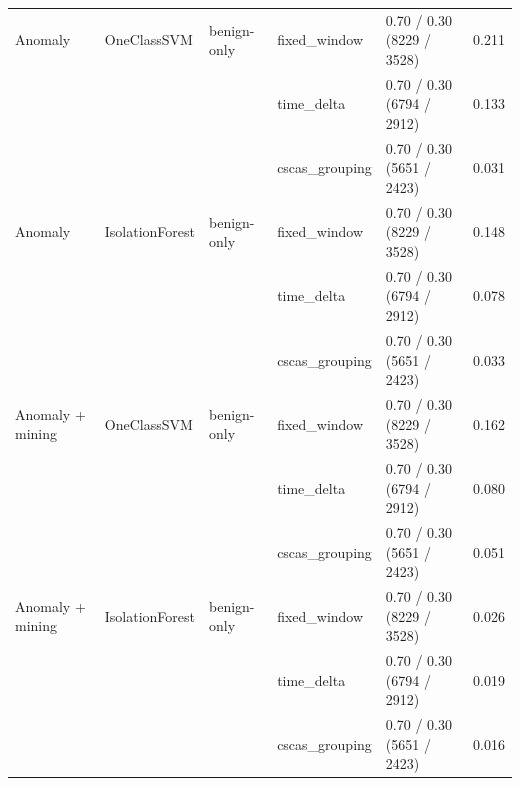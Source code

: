 \begin{table}[htbp]
{\begin{tabular}{lllllc}
\midrule
Anomaly & OneClassSVM & benign-only & fixed\_window & 0.70 / 0.30 (8229 / 3528) & 0.211 \\
 &  &  & time\_delta & 0.70 / 0.30 (6794 / 2912) & 0.133 \\
 &  &  & cscas\_grouping & 0.70 / 0.30 (5651 / 2423) & 0.031 \\
\addlinespace
Anomaly & IsolationForest & benign-only & fixed\_window & 0.70 / 0.30 (8229 / 3528) & 0.148 \\
 &  &  & time\_delta & 0.70 / 0.30 (6794 / 2912) & 0.078 \\
 &  &  & cscas\_grouping & 0.70 / 0.30 (5651 / 2423) & 0.033 \\
\addlinespace
Anomaly + mining & OneClassSVM & benign-only & fixed\_window & 0.70 / 0.30 (8229 / 3528) & 0.162 \\
 &  &  & time\_delta & 0.70 / 0.30 (6794 / 2912) & 0.080 \\
 &  &  & cscas\_grouping & 0.70 / 0.30 (5651 / 2423) & 0.051 \\
\addlinespace
Anomaly + mining & IsolationForest & benign-only & fixed\_window & 0.70 / 0.30 (8229 / 3528) & 0.026 \\
 &  &  & time\_delta & 0.70 / 0.30 (6794 / 2912) & 0.019 \\
 &  &  & cscas\_grouping & 0.70 / 0.30 (5651 / 2423) & 0.016 \\
\bottomrule
\end{tabular}%
}
\end{table}

